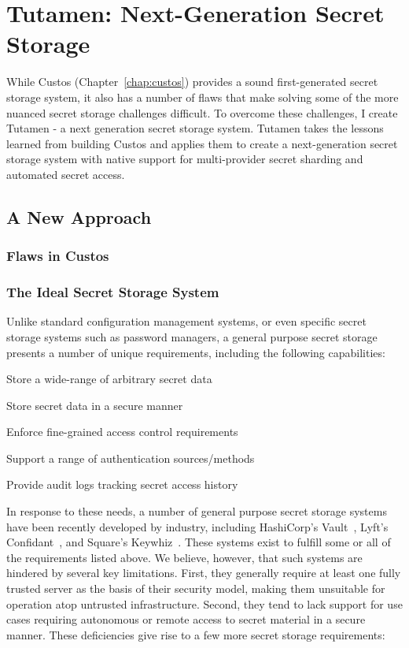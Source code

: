 \chapter{Tutamen: Next-Generation Secret Storage}
\label{chap:tutamen}

While Custos (Chapter~\ref{chap:custos}) provides a sound
first-generated secret storage system, it also has a number of flaws
that make solving some of the more nuanced secret storage challenges
difficult. To overcome these challenges, I create Tutamen - a next
generation secret storage system. Tutamen takes the lessons learned
from building Custos and applies them to create a next-generation
secret storage system with native support for multi-provider secret
sharding and automated secret access.

\section{A New Approach}
\label{chap:tutamen:new}

\subsection{Flaws in Custos}



\subsection{The Ideal Secret Storage System}

Unlike standard configuration management systems, or even specific
secret storage systems such as password managers, a general purpose
secret storage presents a number of unique requirements, including the
following capabilities:

\begin{packed_item}
\item Store a wide-range of arbitrary secret data
\item Store secret data in a secure manner
\item Enforce fine-grained access control requirements
\item Support a range of authentication sources/methods
\item Provide audit logs tracking secret access history
\end{packed_item}

In response to these needs, a number of general purpose secret storage
systems have been recently developed by industry, including
HashiCorp's Vault~\cite{vault}, Lyft's Confidant~\cite{confidant}, and
Square's Keywhiz~\cite{keywhiz}. These systems exist to fulfill some
or all of the requirements listed above. We believe, however, that
such systems are hindered by several key limitations. First, they
generally require at least one fully trusted server as the basis of
their security model, making them unsuitable for operation atop
untrusted infrastructure. Second, they tend to lack support for use
cases requiring autonomous or remote access to secret material in a
secure manner. These deficiencies give rise to a few more secret
storage requirements:

